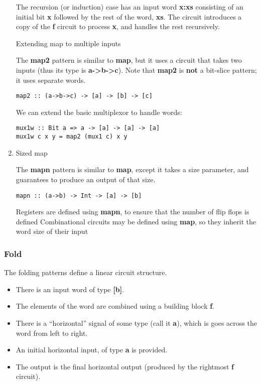 \documentclass[11pt]{article}
\begin{document}
\begin{enumerate}
The recursion (or induction) case has an input word \textbf{x:xs} consisting
of an initial bit \textbf{x} followed by the rest of the word, \textbf{xs}.  The
circuit introduces a copy of the \textbf{f} circuit to process \textbf{x}, and
handles the rest recursively.


Extending map to multiple inputs

The \textbf{map2} pattern is similar to \textbf{map}, but it uses a
circuit that takes two inputs (thus its type is \textbf{a->b->c}).
Note that \textbf{map2} is \textbf{not} a bit-slice pattern; it uses
separate words.


\begin{verbatim}
map2 :: (a->b->c) -> [a] -> [b] -> [c]
\end{verbatim}


We can extend the basic multiplexor to handle words:


\begin{verbatim}
mux1w :: Bit a => a -> [a] -> [a] -> [a]
mux1w c x y = map2 (mux1 c) x y
\end{verbatim}

\item Sized map
\label{sec:orgeb2443f}

The \textbf{mapn} pattern is similar to \textbf{map}, except it
takes a size parameter, and guarantees to produce an output of that
size.


\begin{verbatim}
mapn :: (a->b) -> Int -> [a] -> [b]
\end{verbatim}



Registers are defined using \textbf{mapn}, to ensure that the number
 of flip flops is defined
Combinational circuits may be defined using \textbf{map}, so
 they inherit the word size of their input
\end{enumerate}

\subsubsection{Fold}
\label{sec:org0e5651a}

The folding patterns define a linear circuit structure.

\begin{itemize}
\item There is an input word of type \textbf{[b]}.
\item The elements of the word are combined using a building block \textbf{f}.

\item There is a ``horizontal'' signal of some type (call it \textbf{a}), which
is goes across the word from left to right.

\item An initial horizontal input, of type \textbf{a} is provided.

\item The output is the final horizontal output (produced by the rightmost
\textbf{f} circuit).
\end{itemize}
\end{document}
